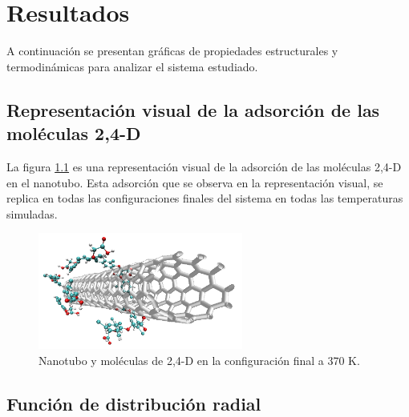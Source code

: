 \chapter{Resultados}

A continuación se presentan gráficas de propiedades estructurales y termodinámicas para analizar el sistema estudiado.



\section{Representación visual de la adsorción de las moléculas 2,4-D}

La figura \ref{fig:Conffinal370} es una representación visual de la adsorción de las moléculas 2,4-D en el nanotubo. Esta adsorción que se observa en la representación visual, se replica en todas las configuraciones finales del sistema en todas las temperaturas simuladas.

\begin{figure}[!h]
    \centering
    \includegraphics[width=0.6\textwidth,keepaspectratio=true]{resultados/all-new-370K.png}
    \caption{Nanotubo y moléculas de 2,4-D en la configuración final a 370 K.}
    \label{fig:Conffinal370}
\end{figure}

\section{Función de distribución radial}

